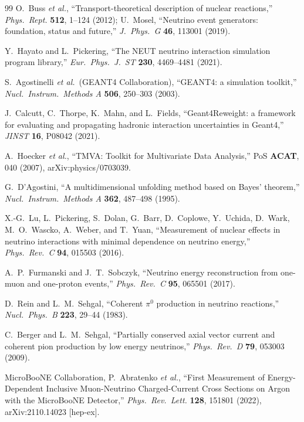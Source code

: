 \begin{thebibliography}{99}
  O.~Buss \textit{et al.},
  ``Transport-theoretical description of nuclear reactions,''
  \textit{Phys.\ Rept.} \textbf{512}, 1--124 (2012);
  U.~Mosel, ``Neutrino event generators: foundation, status and future,''
  \textit{J.\ Phys.\ G} \textbf{46}, 113001 (2019).

  Y.~Hayato and L.~Pickering,
  ``The NEUT neutrino interaction simulation program library,''
  \textit{Eur.\ Phys.\ J.\ ST} \textbf{230}, 4469--4481 (2021).

  S.~Agostinelli \textit{et al.}\ (GEANT4 Collaboration),
  ``GEANT4: a simulation toolkit,''
  \textit{Nucl.\ Instrum.\ Methods A} \textbf{506}, 250--303 (2003).

  J.~Calcutt, C.~Thorpe, K.~Mahn, and L.~Fields,
  ``Geant4Reweight: a framework for evaluating and propagating hadronic
  interaction uncertainties in Geant4,''
  \textit{JINST} \textbf{16}, P08042 (2021).

  A.~Hoecker \textit{et al.},
  ``TMVA: Toolkit for Multivariate Data Analysis,''
  PoS \textbf{ACAT}, 040 (2007), arXiv:physics/0703039.

  G.~D'Agostini,
  ``A multidimensional unfolding method based on Bayes' theorem,''
  \textit{Nucl.\ Instrum.\ Methods A} \textbf{362}, 487--498 (1995).

  X.-G.~Lu, L.~Pickering, S.~Dolan, G.~Barr, D.~Coplowe, Y.~Uchida, D.~Wark,
  M.~O.~Wascko, A.~Weber, and T.~Yuan,
  ``Measurement of nuclear effects in neutrino interactions with minimal
  dependence on neutrino energy,''
  \textit{Phys.\ Rev.\ C} \textbf{94}, 015503 (2016).

  A.~P.~Furmanski and J.~T.~Sobczyk,
  ``Neutrino energy reconstruction from one-muon and one-proton events,''
  \textit{Phys.\ Rev.\ C} \textbf{95}, 065501 (2017).

  D.~Rein and L.~M.~Sehgal,
  ``Coherent $\pi^0$ production in neutrino reactions,''
  \textit{Nucl.\ Phys.\ B} \textbf{223}, 29--44 (1983).

  C.~Berger and L.~M.~Sehgal,
  ``Partially conserved axial vector current and coherent pion production by
  low energy neutrinos,''
  \textit{Phys.\ Rev.\ D} \textbf{79}, 053003 (2009).

  MicroBooNE Collaboration, P.~Abratenko \textit{et al.},
  ``First Measurement of Energy-Dependent Inclusive Muon-Neutrino
  Charged-Current Cross Sections on Argon with the MicroBooNE Detector,''
  \textit{Phys.\ Rev.\ Lett.} \textbf{128}, 151801 (2022), arXiv:2110.14023 [hep-ex].


\end{thebibliography}

